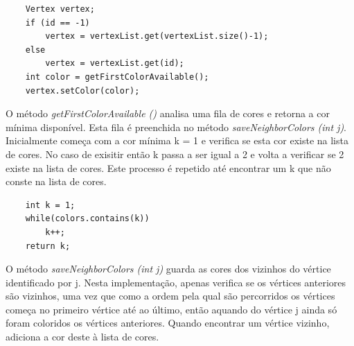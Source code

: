 \documentclass[a4paper,12pt]{report}
\begin{document}
\begin{lstlisting}
    Vertex vertex;
    if (id == -1)   
        vertex = vertexList.get(vertexList.size()-1);
    else
        vertex = vertexList.get(id);
    int color = getFirstColorAvailable();
    vertex.setColor(color);
\end{lstlisting}

O método \textit{getFirstColorAvailable ()} analisa uma fila de cores e retorna a cor mínima disponível. Esta fila é preenchida no método \textit{saveNeighborColors (int j)}.
Inicialmente começa com a cor mínima k = 1 e verifica se esta cor existe na lista de cores. 
No caso de exisitir então k passa a ser igual a 2 e volta a verificar se 2 existe na lista de cores. Este processo é repetido até encontrar um k que não conste na lista de cores.

\begin{center}
\end{center}

\begin{lstlisting}
    int k = 1;
    while(colors.contains(k))
        k++;
    return k;
\end{lstlisting}

O método \textit{saveNeighborColors (int j)} guarda as cores dos vizinhos do vértice identificado por j. 
Nesta implementação, apenas verifica se os vértices anteriores são vizinhos, uma vez que como a ordem pela qual são percorridos os vértices começa no primeiro vértice até ao último, então aquando do vértice j ainda só foram coloridos os vértices anteriores.
Quando encontrar um vértice vizinho, adiciona a cor deste à lista de cores.
\end{document}
